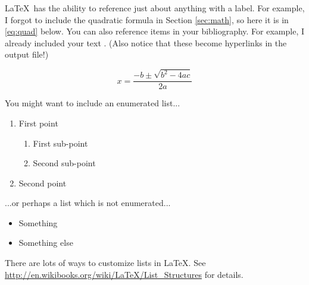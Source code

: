 \LaTeX\ has the ability to reference just about anything with a label. For example, I forgot to include the quadratic formula in Section \ref{sec:math}, so here it is in \eqref{eq:quad} below. You can also reference items in your bibliography. For example, I already included your text \cite{text}. (Also notice that these become hyperlinks in the output file!)

\begin{equation}\label{eq:quad}
x=\frac{-b\pm\sqrt{b^2-4ac}}{2a}
\end{equation}

You might want to include an enumerated list...
\begin{enumerate}
\item First point
\begin{enumerate}
\item First sub-point
\item Second sub-point
\end{enumerate}
\item Second point
\end{enumerate}
...or perhaps a list which is not enumerated...
\begin{itemize}
\item Something
\item Something else
\end{itemize}
There are lots of ways to customize lists in \LaTeX. See \url{http://en.wikibooks.org/wiki/LaTeX/List_Structures} for details.

\begin{center}
\end{center}


